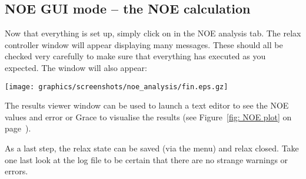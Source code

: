 \subsection{NOE GUI mode -- the NOE calculation}

Now that everything is set up, simply click on  in the NOE analysis tab.  The relax controller window will appear displaying many messages.  These should all be checked very carefully to make sure that everything has executed as you expected.  The  window will also appear:

\begin{minipage}[h]{\linewidth}
\centerline{\texttt{[image: graphics/screenshots/noe\_analysis/fin.eps.gz]}}
\end{minipage}

The results viewer window can be used to launch a text editor to see the NOE values and error or Grace to visualise the results (see Figure~\ref{fig: NOE plot} on page~\pageref{fig: NOE plot}).

As a last step, the relax state can be saved (via the  menu) and relax closed.  Take one last look at the  log file to be certain that there are no strange warnings or errors.
